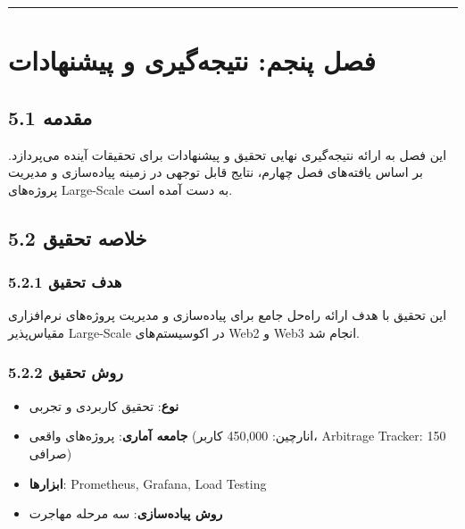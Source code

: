 \documentclass[
]{article}
\providecommand{\tightlist}{%
  \setlength{\itemsep}{0pt}\setlength{\parskip}{0pt}}
\begin{document}
\begin{center}\rule{0.5\linewidth}{0.5pt}\end{center}

\section{فصل پنجم: نتیجه‌گیری و
پیشنهادات}\label{ux641ux635ux644-ux67eux646ux62cux645-ux646ux62aux6ccux62cux647ux6afux6ccux631ux6cc-ux648-ux67eux6ccux634ux646ux647ux627ux62fux627ux62a}

\subsection{5.1 مقدمه}\label{ux645ux642ux62fux645ux647-3}

این فصل به ارائه نتیجه‌گیری نهایی تحقیق و پیشنهادات برای تحقیقات آینده
می‌پردازد. بر اساس یافته‌های فصل چهارم، نتایج قابل توجهی در زمینه
پیاده‌سازی و مدیریت پروژه‌های Large-Scale به دست آمده است.

\subsection{5.2 خلاصه
تحقیق}\label{ux62eux644ux627ux635ux647-ux62aux62dux642ux6ccux642}

\subsubsection{5.2.1 هدف
تحقیق}\label{ux647ux62fux641-ux62aux62dux642ux6ccux642}

این تحقیق با هدف ارائه راه‌حل جامع برای پیاده‌سازی و مدیریت پروژه‌های
نرم‌افزاری مقیاس‌پذیر Large-Scale در اکوسیستم‌های Web2 و Web3 انجام شد.

\subsubsection{5.2.2 روش
تحقیق}\label{ux631ux648ux634-ux62aux62dux642ux6ccux642}

\begin{itemize}
\tightlist
\item
  \textbf{نوع}: تحقیق کاربردی و تجربی
\item
  \textbf{جامعه آماری}: پروژه‌های واقعی (انارچین: 450,000 کاربر،
  Arbitrage Tracker: 150 صرافی)
\item
  \textbf{ابزارها}: Prometheus, Grafana, Load Testing
\item
  \textbf{روش پیاده‌سازی}: سه مرحله مهاجرت
\end{itemize}
\end{document}
